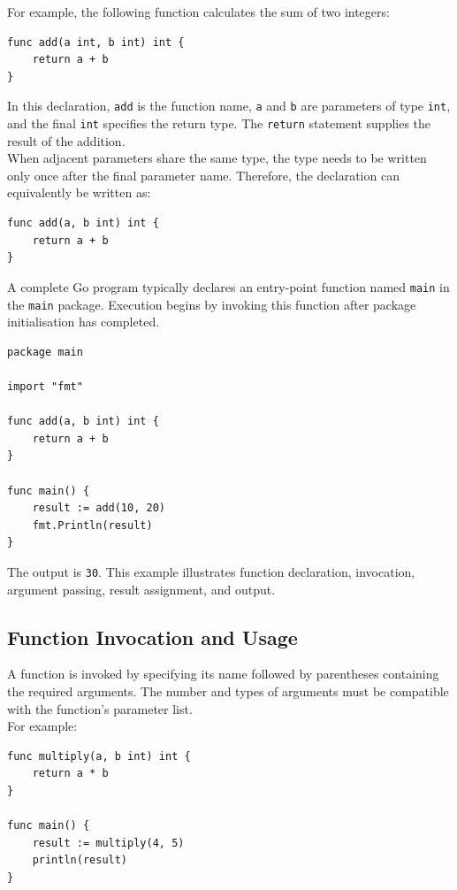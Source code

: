 For example, the following function calculates the sum of two integers:

\begin{lstlisting}
func add(a int, b int) int {
    return a + b
}
\end{lstlisting}

In this declaration, \texttt{add} is the function name, \texttt{a} and \texttt{b} are parameters of type \texttt{int}, and the final \texttt{int} specifies the return type. The \texttt{return} statement supplies the result of the addition.\\

When adjacent parameters share the same type, the type needs to be written only once after the final parameter name. Therefore, the declaration can equivalently be written as:

\begin{lstlisting}
func add(a, b int) int {
    return a + b
}
\end{lstlisting}

A complete Go program typically declares an entry-point function named \texttt{main} in the \texttt{main} package. Execution begins by invoking this function after package initialisation has completed.

\begin{lstlisting}
package main

import "fmt"

func add(a, b int) int {
    return a + b
}

func main() {
    result := add(10, 20)
    fmt.Println(result)
}
\end{lstlisting}

The output is \texttt{30}. This example illustrates function declaration, invocation, argument passing, result assignment, and output.

\subsection{Function Invocation and Usage}

A function is invoked by specifying its name followed by parentheses containing the required arguments. The number and types of arguments must be compatible with the function's parameter list.\\

For example:

\begin{lstlisting}
func multiply(a, b int) int {
    return a * b
}

func main() {
    result := multiply(4, 5)
    println(result)
}
\end{lstlisting}

